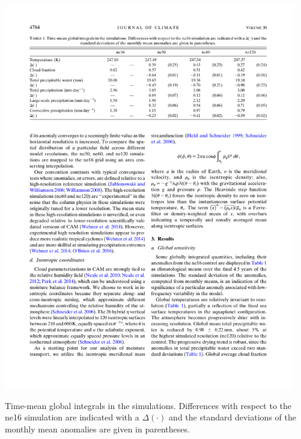 \begin{table}[t]
\begin{center}
\noindent\includegraphics[width=30pc,angle=0]{chapter2/table1.pdf}\\
\end{center}
\caption{Time-mean global integrals in the simulations. Differences with respect to the ne16 simulation are indicated with a $\Delta ( \cdot )$ and the standard deviations of the monthly mean anomalies are given in parentheses.}
\label{tbl:table2-1}
\end{table}

